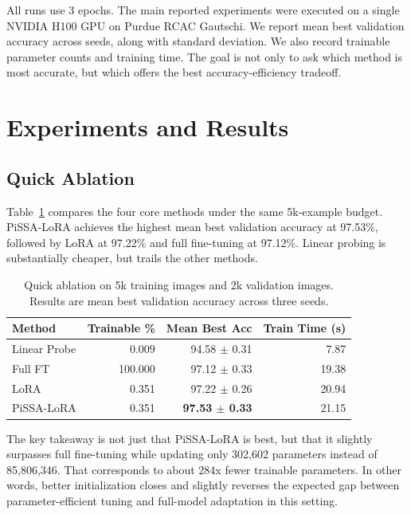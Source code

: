 \documentclass{article}
\begin{document}
All runs use 3 epochs. The main reported experiments were executed on a single NVIDIA H100 GPU on Purdue RCAC Gautschi. We report mean best validation accuracy across seeds, along with standard deviation. We also record trainable parameter counts and training time. The goal is not only to ask which method is most accurate, but which offers the best accuracy-efficiency tradeoff.

\section{Experiments and Results}

\subsection{Quick Ablation}

Table~\ref{tab:quick} compares the four core methods under the same 5k-example budget. PiSSA-LoRA achieves the highest mean best validation accuracy at 97.53\%, followed by LoRA at 97.22\% and full fine-tuning at 97.12\%. Linear probing is substantially cheaper, but trails the other methods.

\begin{table}[t]
\caption{Quick ablation on 5k training images and 2k validation images. Results are mean best validation accuracy across three seeds.}
\label{tab:quick}
\begin{center}
\begin{tabular}{lrrr}
\toprule
Method & Trainable \% & Mean Best Acc & Train Time (s) \\
\midrule
Linear Probe & 0.009 & 94.58 $\pm$ 0.31 & 7.87 \\
Full FT & 100.000 & 97.12 $\pm$ 0.33 & 19.38 \\
LoRA & 0.351 & 97.22 $\pm$ 0.26 & 20.94 \\
PiSSA-LoRA & 0.351 & \textbf{97.53 $\pm$ 0.33} & 21.15 \\
\bottomrule
\end{tabular}
\end{center}
\end{table}

The key takeaway is not just that PiSSA-LoRA is best, but that it slightly surpasses full fine-tuning while updating only 302,602 parameters instead of 85,806,346. That corresponds to about 284x fewer trainable parameters. In other words, better initialization closes and slightly reverses the expected gap between parameter-efficient tuning and full-model adaptation in this setting.
\end{document}

